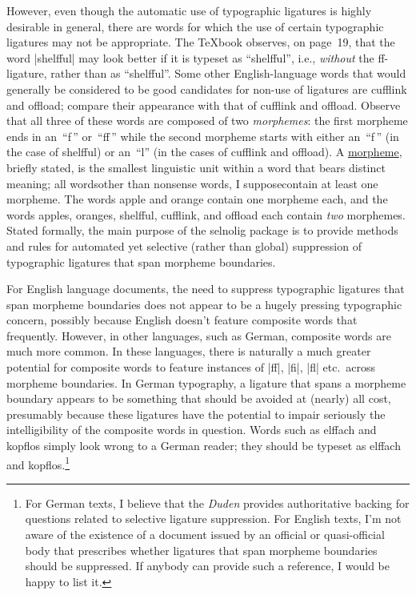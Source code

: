 \documentclass[11pt]{article}
\newcommand{\pkg}[1]{\textsf{#1}}
\begin{document}
However, even though the automatic use of typographic ligatures is highly desirable in general, there are words for which the use of certain typographic ligatures may not be appropriate. The \TeX book observes, on page~19, that the word |shelfful| may look better if it is typeset as \enquote{shelfful}, i.e., \emph{without} the ff-ligature, rather than as \enquote{\mbox{shelfful}}. Some other English-language words that would generally be considered to be good candidates for non-use of ligatures are \mbox{cufflink} and \mbox{offload}; compare their appearance with that of cufflink and offload. Observe that all three of these words are composed of two \emph{morphemes}: the first morpheme ends in an~\enquote{f\,} or~\enquote{ff\,} while the second morpheme starts with either an~\enquote{f\,} (in the case of shelfful) or an~\enquote{l} (in the cases of cufflink and offload). A \href{http://en.wikipedia.org/wiki/Morpheme}{morpheme}, briefly stated, is the smallest linguistic unit within a word that bears distinct meaning; all words\textemdash other than nonsense words, I suppose\textemdash contain at least one morpheme. The words apple and orange contain one morpheme each, and the words apples, oranges, shelfful, cufflink, and offload each contain \emph{two} morphemes. Stated formally, the main purpose of the \pkg{selnolig} package is to provide methods and rules for automated yet selective (rather than global) suppression of typographic ligatures that span morpheme boundaries.

For English language documents, the need to suppress typographic ligatures that span morpheme boundaries does not appear to be a hugely pressing typographic concern, possibly because English doesn't feature composite words that frequently. However, in other languages, such as German, composite words are much more common. In these languages, there is naturally a much greater potential for composite words to feature instances of |ff|, |fi|, |fl| etc.\ across morpheme boundaries. In German typography, a ligature that spans a morpheme boundary appears to be something that should be avoided at (nearly) all cost, presumably because these ligatures have the potential to impair seriously the intelligibility of the composite words in question. Words such as \mbox{elffach} and \mbox{kopflos} simply look wrong to a German reader; they should be typeset as elffach and kopflos.\footnote{For German texts, I believe that the \emph{Duden} provides authoritative backing for questions related to selective ligature suppression. For English texts, I'm not aware of the existence of a document issued by an official or quasi-official body that prescribes whether ligatures that span morpheme boundaries should be suppressed. If anybody can provide such a reference, I would be happy to list it.}
\end{document}
